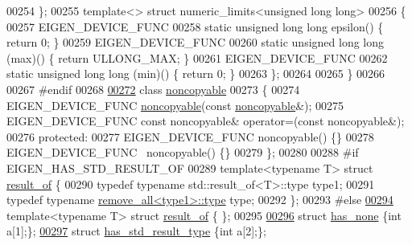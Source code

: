 \begin{DoxyCode}
00254 \};
00255 \textcolor{keyword}{template}<> \textcolor{keyword}{struct }numeric\_limits<unsigned long long>
00256 \{
00257   EIGEN\_DEVICE\_FUNC
00258   \textcolor{keyword}{static} \textcolor{keywordtype}{unsigned} \textcolor{keywordtype}{long} \textcolor{keywordtype}{long} epsilon() \{ \textcolor{keywordflow}{return} 0; \}
00259   EIGEN\_DEVICE\_FUNC
00260   \textcolor{keyword}{static} \textcolor{keywordtype}{unsigned} \textcolor{keywordtype}{long} long (max)() \{ \textcolor{keywordflow}{return} ULLONG\_MAX; \}
00261   EIGEN\_DEVICE\_FUNC
00262   \textcolor{keyword}{static} \textcolor{keywordtype}{unsigned} \textcolor{keywordtype}{long} long (min)() \{ \textcolor{keywordflow}{return} 0; \}
00263 \};
00264 
00265 \}
00266 
00267 \textcolor{preprocessor}{#endif}
00268 
\hyperlink{class_eigen_1_1internal_1_1noncopyable}{00272} \textcolor{keyword}{class }\hyperlink{class_eigen_1_1internal_1_1noncopyable}{noncopyable}
00273 \{
00274   EIGEN\_DEVICE\_FUNC \hyperlink{class_eigen_1_1internal_1_1noncopyable}{noncopyable}(\textcolor{keyword}{const} \hyperlink{class_eigen_1_1internal_1_1noncopyable}{noncopyable}&);
00275   EIGEN\_DEVICE\_FUNC \textcolor{keyword}{const} noncopyable& operator=(\textcolor{keyword}{const} noncopyable&);
00276 \textcolor{keyword}{protected}:
00277   EIGEN\_DEVICE\_FUNC noncopyable() \{\}
00278   EIGEN\_DEVICE\_FUNC ~noncopyable() \{\}
00279 \};
00280 
00288 \textcolor{preprocessor}{#if EIGEN\_HAS\_STD\_RESULT\_OF}
00289 \textcolor{keyword}{template}<\textcolor{keyword}{typename} T> \textcolor{keyword}{struct }\hyperlink{struct_eigen_1_1internal_1_1result__of}{result\_of} \{
00290   \textcolor{keyword}{typedef} \textcolor{keyword}{typename} std::result\_of<T>::type type1;
00291   \textcolor{keyword}{typedef} \textcolor{keyword}{typename} \hyperlink{group___sparse_core___module}{remove\_all<type1>::type} type;
00292 \};
00293 \textcolor{preprocessor}{#else}
\hyperlink{struct_eigen_1_1internal_1_1result__of}{00294} \textcolor{keyword}{template}<\textcolor{keyword}{typename} T> \textcolor{keyword}{struct }\hyperlink{struct_eigen_1_1internal_1_1result__of}{result\_of} \{ \};
00295 
\hyperlink{struct_eigen_1_1internal_1_1has__none}{00296} \textcolor{keyword}{struct }\hyperlink{struct_eigen_1_1internal_1_1has__none}{has\_none} \{\textcolor{keywordtype}{int} a[1];\};
\hyperlink{struct_eigen_1_1internal_1_1has__std__result__type}{00297} \textcolor{keyword}{struct }\hyperlink{struct_eigen_1_1internal_1_1has__std__result__type}{has\_std\_result\_type} \{\textcolor{keywordtype}{int} a[2];\};

\end{DoxyCode}
